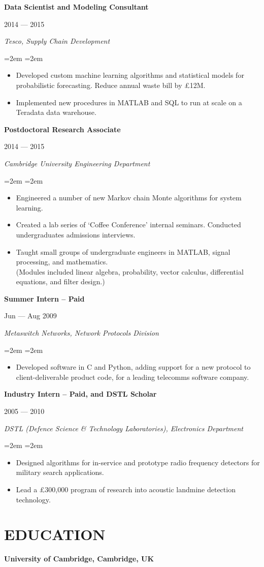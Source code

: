 \documentclass[letterpaper,10pt]{article}
\newcommand{\sepspace}{\vspace*{0.3em}}
\newcommand{\NewPart}[1]{\vspace{-1em} \section*{\uppercase{#1}}}
\newcommand{\MainHeading}[1]{\noindent\textbf{#1}}
\newcommand{\SubHeading}[1]{\noindent\textit{#1}}
\newcommand{\DateBox}[1]{\colorbox{light-gray}{\parbox{8em}{\hfill\color{White}#1}}}
\newcommand{\Details}[1]{\hangindent=2em\hangafter=0\small#1\normalsize\par}
\newcommand{\WorkEntry}[4]{%
                \MainHeading{#1} \hfill \DateBox{#2} \par
                \SubHeading{#3} \par
                \noindent \hangindent=2em \hangafter=0 \Details{#4} }
\begin{document}
\WorkEntry{Data Scientist and Modeling Consultant}{2014 --- 2015}{Tesco, Supply Chain Development}{
\begin{itemize}
 \item Developed custom machine learning algorithms and statistical models for probabilistic forecasting. Reduce annual waste bill by \pounds 12M.
 \item Implemented new procedures in MATLAB and SQL to run at scale on a Teradata data warehouse.
\end{itemize}
}
\sepspace

\WorkEntry{Postdoctoral Research Associate}{2014 --- 2015}{Cambridge University Engineering Department}{
\begin{itemize}
 \item Engineered a number of new Markov chain Monte algorithms for system learning.
 \item Created a lab series of `Coffee Conference' internal seminars. Conducted undergraduates admissions interviews.
 \item Taught small groups of undergraduate engineers in MATLAB, signal processing, and mathematics. \\ (Modules included linear algebra, probability, vector calculus, differential equations, and filter design.)
\end{itemize}
}
\sepspace

\WorkEntry{Summer Intern -- Paid}{Jun --- Aug 2009}{Metaswitch Networks, Network Protocols Division}{
\begin{itemize}
  \item Developed software in C and Python, adding support for a new protocol to client-deliverable product code, for a leading telecomms software company.
\end{itemize}
}
\sepspace

\WorkEntry{Industry Intern -- Paid, and DSTL Scholar}{2005 --- 2010}{DSTL (Defence Science \& Technology Laboratories), Electronics Department}{
\begin{itemize}
  \item Designed algorithms for in-service and prototype radio frequency detectors for military search applications.
  \item Lead a \pounds300,000 program of research into acoustic landmine detection technology.
\end{itemize}
}



\NewPart{Education}

\MainHeading{University of Cambridge, Cambridge, UK}
\end{document}
